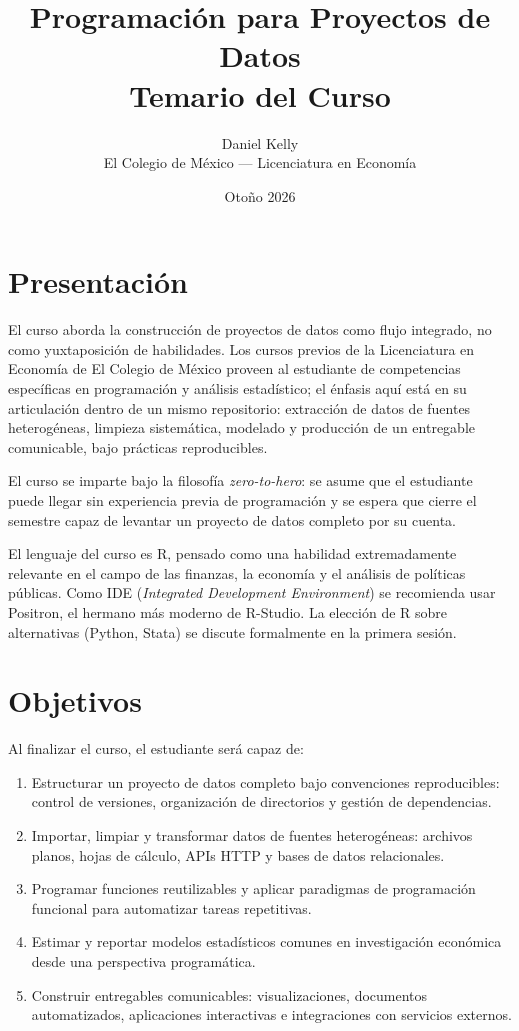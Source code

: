 \documentclass[11pt,letterpaper]{article}
\title{\color{main}\textbf{Programación para Proyectos de Datos}\\[0.3em]
       \large\color{subtitle}Temario del Curso}
\author{Daniel Kelly\\
        \small El Colegio de México --- Licenciatura en Economía}
\date{Otoño 2026}
\begin{document}
\maketitle

\section{Presentación}

El curso aborda la construcción de proyectos de datos como flujo integrado, no como yuxtaposición de habilidades. Los cursos previos de la Licenciatura en Economía de El Colegio de México proveen al estudiante de competencias específicas en programación y análisis estadístico; el énfasis aquí está en su articulación dentro de un mismo repositorio: extracción de datos de fuentes heterogéneas, limpieza sistemática, modelado y producción de un entregable comunicable, bajo prácticas reproducibles.

El curso se imparte bajo la filosofía \textit{zero-to-hero}: se asume que el estudiante puede llegar sin experiencia previa de programación y se espera que cierre el semestre capaz de levantar un proyecto de datos completo por su cuenta.

El lenguaje del curso es R, pensado como una habilidad extremadamente relevante en el campo de las finanzas, la economía y el análisis de políticas públicas. Como IDE (\textit{Integrated Development Environment}) se recomienda usar Positron, el hermano más moderno de R-Studio. La elección de R sobre alternativas (Python, Stata) se discute formalmente en la primera sesión.

\section{Objetivos}

Al finalizar el curso, el estudiante será capaz de:

\begin{enumerate}[leftmargin=*]
    \item Estructurar un proyecto de datos completo bajo convenciones reproducibles: control de versiones, organización de directorios y gestión de dependencias.
    \item Importar, limpiar y transformar datos de fuentes heterogéneas: archivos planos, hojas de cálculo, APIs HTTP y bases de datos relacionales.
    \item Programar funciones reutilizables y aplicar paradigmas de programación funcional para automatizar tareas repetitivas.
    \item Estimar y reportar modelos estadísticos comunes en investigación económica desde una perspectiva programática.
    \item Construir entregables comunicables: visualizaciones, documentos automatizados, aplicaciones interactivas e integraciones con servicios externos.
\end{enumerate}
\end{document}
